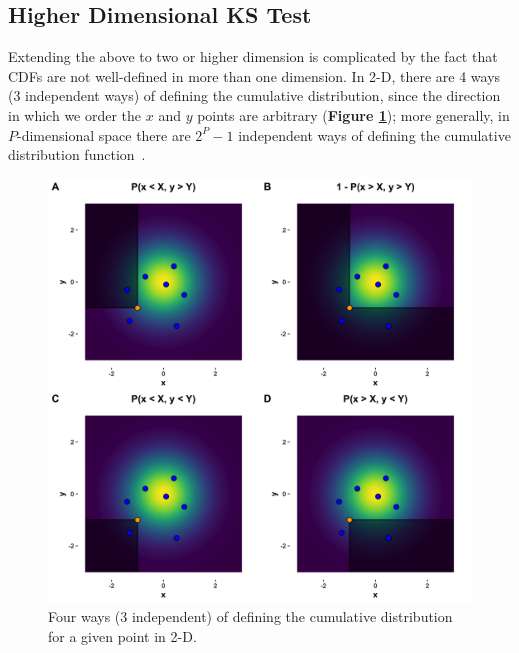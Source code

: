 \documentclass[codesnippet]{jss}
\begin{document}
\subsection{Higher Dimensional KS Test}

Extending the above to two or higher dimension is complicated by the fact that CDFs are not well-defined in more than one dimension.  In 2-D, there are 4 ways (3 independent ways) of defining the cumulative distribution, since the direction in which we order the $x$ and $y$ points are arbitrary (\textbf{Figure \ref{fig:kstest2Dissue}}); more generally, in $P$-dimensional space there are $2^{P}-1$ independent ways of defining the cumulative distribution function~\citep{Peacock1983}.

\begin{figure}[t!]
\centering
\includegraphics{CDF2Dissue}
\caption{\label{fig:kstest2Dissue} Four ways (3 independent) of defining the cumulative distribution for a given point in 2-D.
}
\end{figure}
\end{document}
